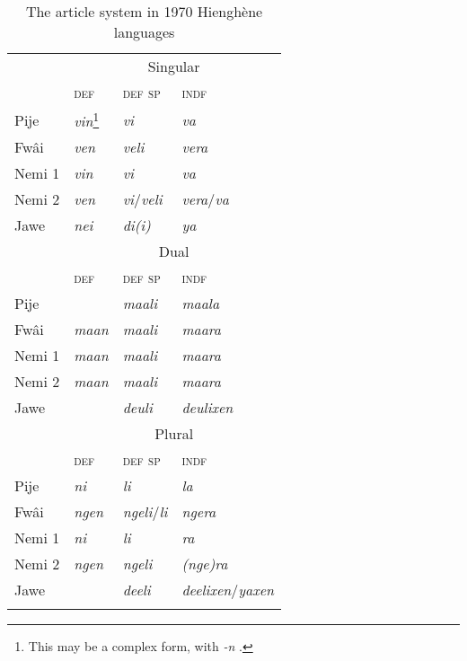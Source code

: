 \begin{table}
	\caption{The article system in 1970 Hienghène languages \parencite[255]{haudricourt_dictionnaire_1982}}
	\begin{tabular}{l lll}
	\lsptoprule
			  &\multicolumn{3}{c}{Singular}\\
		      &\textsc{def}          & \textsc{def} \textsc{sp}                    & \textsc{indf}\\\midrule
		Pije  & \textit{vin}\footnote{This may be a complex form, with \textit{-n} \qu{\gl{nspec}}.} 
                             & \textit{vi}                 & \textit{va}               \\ 
		Fwâi  & \textit{ven} & \textit{veli}               & \textit{vera}             \\ 
		Nemi 1& \textit{vin} & \textit{vi}                 & \textit{va}               \\ 
		Nemi 2& \textit{ven} & \textit{vi}/\textit{veli}   &\textit{vera}/\textit{va}  \\ 
		Jawe  & \textit{nei} & \textit{di(i)}              & \textit{ya}               \\\midrule
		
		&\multicolumn{3}{c}{Dual}\\
			   &\textsc{def}          & \textsc{def} \textsc{sp}                    & \textsc{indf}\\\midrule
		Pije   &               &\textit{maali}   & \textit{maala}\\    
		Fwâi   & \textit{maan} & \textit{maali}  & \textit{maara}\\    
		Nemi 1 & \textit{maan} & \textit{maali}  & \textit{maara}\\    
		Nemi 2 & \textit{maan} & \textit{maali}  & \textit{maara}\\    
		Jawe   &               & \textit{deuli}  & \textit{deulixen}\\\midrule
		
		&\multicolumn{3}{c}{Plural}\\
		      &\textsc{def}          & \textsc{def} \textsc{sp}                    & \textsc{indf}\\\midrule
		Pije  & \textit{ni}   & \textit{li}                & \textit{la}\\
		Fwâi  & \textit{ngen} & \textit{ngeli}/\textit{li} & \textit{ngera}\\
		Nemi 1& \textit{ni}   & \textit{li}                & \textit{ra}\\
		Nemi 2& \textit{ngen} & \textit{ngeli}             & \textit{(nge)ra}\\
		Jawe  &               & \textit{deeli}             & \textit{deelixen}/\textit{yaxen}\\
		
		\lspbottomrule
	\end{tabular}
\label{tab:hyehen_articles}
\end{table}

